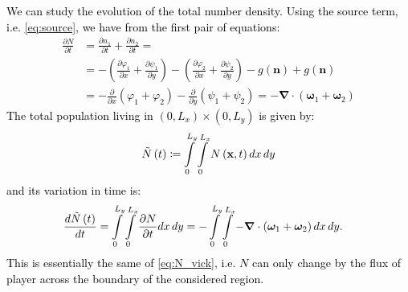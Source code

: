\textcolor{black}{We can study the evolution of the total number density.
Using the source term, i.e. \ref{eq:source}, we have from the first
pair of equations:
\begin{align*}
\frac{\partial N}{\partial t} & =\frac{\partial n_{1}}{\partial t}+\frac{\partial n_{2}}{\partial t}=\\
 & =-\left(\frac{\partial\varphi_{1}}{\partial x}+\frac{\partial\psi_{1}}{\partial y}\right)-\left(\frac{\partial\varphi_{2}}{\partial x}+\frac{\partial\psi_{2}}{\partial y}\right)-g\left(\mathbf{n}\right)+g\left(\mathbf{n}\right)\\
 & =-\frac{\partial}{\partial x}\left(\varphi_{1}+\varphi_{2}\right)-\frac{\partial}{\partial y}\left(\psi_{1}+\psi_{2}\right)=-\bm{\nabla}\cdot\left(\bm{\omega}_{1}+\bm{\omega}_{2}\right)
\end{align*}
The total population living in $\left(0,L_{x}\right)\times\left(0,L_{y}\right)$
is given by:
\begin{equation}
\tilde{N}\left(t\right)\coloneqq\intop_{0}^{L_{y}}\intop_{0}^{L_{x}}N\left(\mathbf{x},t\right)dx\,dy\label{eq:N_tot}
\end{equation}
 and its variation in time is:
\begin{align}
\frac{d\tilde{N}\left(t\right)}{dt} & =\intop_{0}^{L_{y}}\intop_{0}^{L_{x}}\frac{\partial N}{\partial t}dx\,dy=-\intop_{0}^{L_{y}}\intop_{0}^{L_{x}}-\bm{\nabla}\cdot\left(\bm{\omega}_{1}+\bm{\omega}_{2}\right)dx\,dy.\label{eq:N_nat}
\end{align}
This is essentially the same of \ref{eq:N_vick}, i.e. $N$ can only
change by the flux of player across the boundary of the considered
region.}

